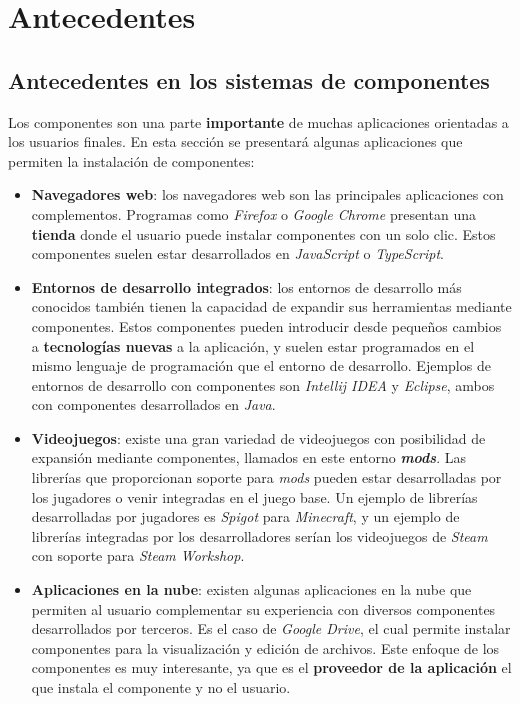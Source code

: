 \chapter{Antecedentes}\label{ch:antecedentes}


\section{Antecedentes en los sistemas de componentes}
\label{sec:antecedentes-en-los-sistemas-de-componentes}

Los componentes son una parte \textbf{importante} de muchas aplicaciones
orientadas a los usuarios finales.
En esta sección se presentará algunas aplicaciones que permiten
la instalación de componentes:

\begin{itemize}
    \item \textbf{Navegadores web}: los navegadores web
    son las principales aplicaciones con complementos.
    Programas como \textit{Firefox} o \textit{Google Chrome}
    presentan una \textbf{tienda} donde el usuario puede instalar
    componentes con un solo clic.
    Estos componentes suelen estar desarrollados en \textit{JavaScript}
    o \textit{TypeScript}.
    \item \textbf{Entornos de desarrollo integrados}: los entornos de
    desarrollo más conocidos también tienen la capacidad de expandir
    sus herramientas mediante componentes.
    Estos componentes pueden introducir desde pequeños cambios
    a \textbf{tecnologías nuevas} a la aplicación, y suelen
    estar programados en el mismo lenguaje de programación
    que el entorno de desarrollo.
    Ejemplos de entornos de desarrollo con componentes
    son \textit{Intellij IDEA} y \textit{Eclipse},
    ambos con componentes desarrollados en \textit{Java}.
    \item \textbf{Videojuegos}: existe una gran variedad
    de videojuegos con posibilidad de expansión mediante
    componentes, llamados en este entorno \textit{\textbf{mods}}.
    Las librerías que proporcionan soporte para \textit{mods}
    pueden estar desarrolladas por los jugadores o venir
    integradas en el juego base.
    Un ejemplo de librerías desarrolladas por jugadores es
    \textit{Spigot} para \textit{Minecraft}, y un ejemplo
    de librerías integradas por los desarrolladores
    serían los videojuegos de \textit{Steam} con soporte
    para \textit{Steam Workshop}.
    \item \textbf{Aplicaciones en la nube}: existen
    algunas aplicaciones en la nube que permiten
    al usuario complementar su experiencia con diversos
    componentes desarrollados por terceros.
    Es el caso de \textit{Google Drive}, el cual permite
    instalar componentes para la visualización y
    edición de archivos.
    Este enfoque de los componentes es muy interesante,
    ya que es el \textbf{proveedor de la aplicación} el que
    instala el componente y no el usuario.
\end{itemize}


